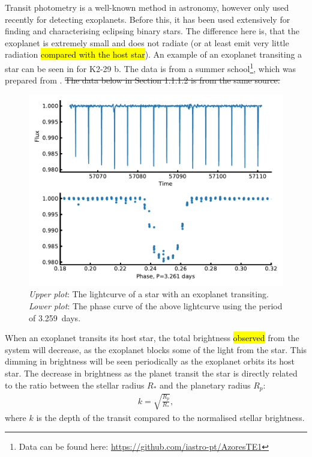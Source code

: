 Transit photometry is a well-known method in astronomy, however only used recently for detecting
exoplanets. Before this, it has been used extensively for finding and characterising eclipsing
binary stars. The difference here is, that the exoplanet is extremely small and does not radiate (or
at least emit very little radiation \hl{compared with the host star}). An example of an exoplanet
transiting a star can be seen in  for K2-29 b. The data is from a summer
school\footnote{Data can be found here: \url{https://github.com/iastro-pt/AzoresTE1}}, which was
prepared from \citet{Santerne2016}. \st{The data below in Section 1.1.1.2 is from the same source.}

\begin{figure}[htpb!]
    \centering
    \includegraphics[width=1.0\linewidth]{figures/transitMethod.pdf}
    \caption{\emph{Upper plot}: The lightcurve of a star with an exoplanet transiting.
             \emph{Lower plot}: The phase curve of the above lightcurve using the period of
             \SI{3.259}{days}.}
    \label{fig:transitMethod}
\end{figure}

When an exoplanet transits its host star, the total brightness \hl{observed} from the system will
decrease, as the exoplanet blocks some of the light from the star. This dimming in brightness will
be seen periodically as the exoplanet orbits its host star. The decrease in brightness as the planet
transit the star is directly related to the ratio between the stellar radius $R_\ast$ and the
planetary radius $R_p$:
\begin{align}
  k = \sqrt{\frac{R_p}{R_\ast}},  \label{eq:transit}
\end{align}
where $k$ is the depth of the transit compared to the normalised stellar brightness.

